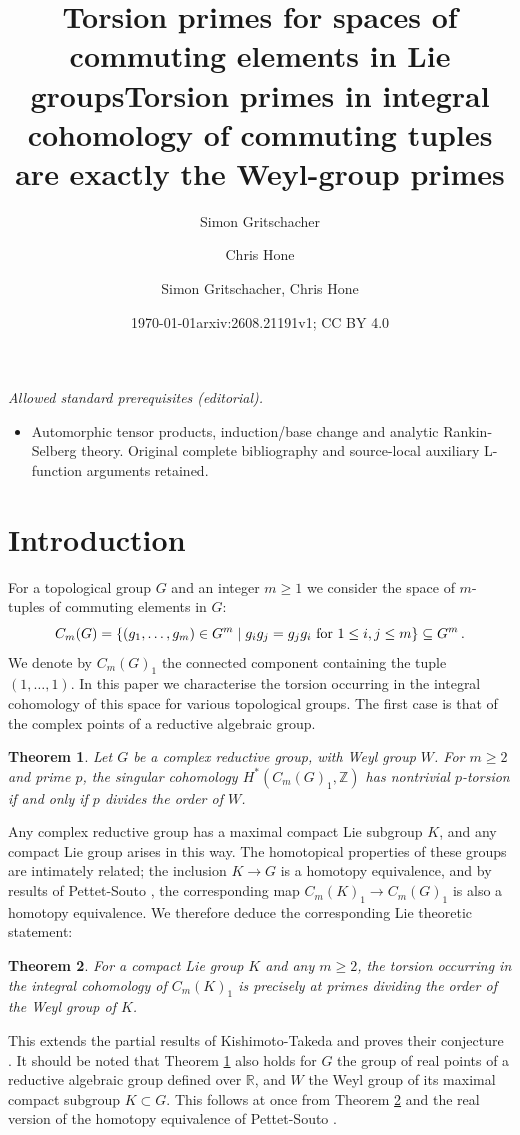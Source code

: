 \documentclass[oneside, 12pt, a4paper]{amsart}
\title[Torsion primes for spaces of commuting elements]{Torsion primes for spaces of commuting elements in Lie groups}
\author{Simon Gritschacher}
\author{Chris Hone}
\date{\today}
\title{Torsion primes in integral cohomology of commuting tuples are exactly the Weyl-group primes}
\author{Simon Gritschacher, Chris Hone}
\date{arxiv:2608.21191v1; CC BY 4.0}
\numberwithin{equation}{section}
\newcommand{\R}{\mathbb{R}}
\newcommand{\Z}{\mathbb{Z}}
\theoremstyle{plain}
\newtheorem{theorem}{Theorem}[section]
\theoremstyle{definition}
\theoremstyle{remark}
\begin{document}
\maketitle
\noindent\textit{Allowed standard prerequisites (editorial).}\begin{itemize}
\item Automorphic tensor products, induction/base change and analytic Rankin-Selberg theory. Original complete bibliography and source-local auxiliary L-function arguments retained.
\end{itemize}\medskip
\section{Introduction}
For a topological group $G$ and an integer $m\geq 1$ we consider the space of $m$-tuples of commuting elements in $G$:
\[
C_m(G)=\{(g_1,\dots,g_m)\in G^m\mid g_ig_j=g_jg_i \textnormal{ for } 1\leq i,j\leq m\}\subseteq G^m\, .
\]
We denote by $C_m(G)_1$ the connected component containing the tuple $(1,\dots,1)$. In this paper we characterise the torsion occurring in the integral cohomology of this space for various topological groups. The first case is that of the complex points of a reductive algebraic group. 


\begin{theorem} \label{thm:mainreductive}
Let $G$ be a complex reductive group, with Weyl group $W$. For $m\geq 2$ and prime $p$, the singular cohomology $H^*(C_m(G)_1,\Z)$ has nontrivial $p$-torsion if and only if $p$ divides the order of $W$.
\end{theorem}

Any complex reductive group has a maximal compact Lie subgroup $K$, and any compact Lie group arises in this way. The homotopical properties of these groups are intimately related; the inclusion $K\to G$ is a homotopy equivalence, and by results of Pettet-Souto \cite{PettetSouto}, the corresponding map $C_m(K)_1\to C_m(G)_1$ is also a homotopy equivalence. We therefore deduce the corresponding Lie theoretic statement:

\begin{theorem} \label{thm:mainlie}
For a compact Lie group $K$ and any $m\geq 2$, the torsion occurring in the integral cohomology of $C_m(K)_1$ is precisely at primes dividing the order of the Weyl group of $K$.
\end{theorem}



This extends the partial results of Kishimoto-Takeda \cite{KishimotoTakeda1} and proves their conjecture \cite[Conjecture 7.11]{KishimotoTakeda1}. It should be noted that Theorem \ref{thm:mainreductive} also holds for $G$ the group of real points of a reductive algebraic group defined over $\R$, and $W$ the Weyl group of its maximal compact subgroup $K\subset G$. This follows at once from Theorem \ref{thm:mainlie} and the  real version of the homotopy equivalence of Pettet-Souto \cite{PettetSouto}. 
\end{document}
